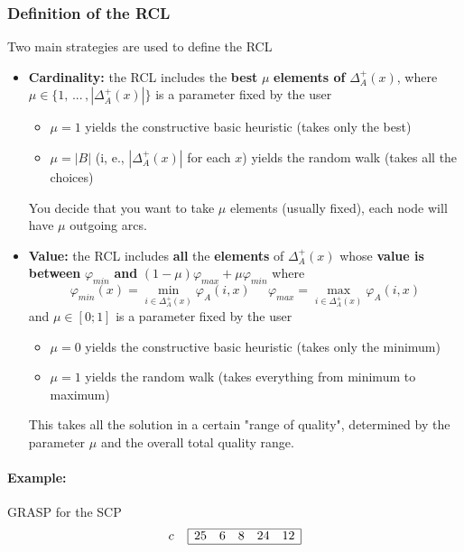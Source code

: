 \subsubsection{Definition of the RCL}
Two main strategies are used to define the RCL
\begin{itemize}
	\item \textbf{Cardinality:} the RCL includes the \textbf{best} $\mu$ \textbf{elements of} $\Delta_A^+ (x)$, where $\mu \in \{1,\, ... \, , |\Delta_A^+(x)|\}$ is a parameter fixed by the user
	\begin{itemize}
		\item $\mu = 1$ yields the constructive basic heuristic (takes only the best)
		\item $\mu = |B|$ (i, e., $|\Delta_A^+ (x)|$ for each $x$) yields the random walk (takes all the choices)
	\end{itemize}
	You decide that you want to take $\mu$ elements (usually fixed), each node will have $\mu$ outgoing arcs.\\
	
	\item \textbf{Value:} the RCL includes \textbf{all} the \textbf{elements} of $\Delta_A^+ (x)$ whose \textbf{value is between} $\varphi_{min}$ \textbf{and} $(1 − \mu) \varphi_{max} + \mu \varphi_{min}$ where
	$$ \varphi_{min} (x) = \min_{i \in \Delta_A^+ (x)} \varphi_A (i,x) \;\;\;\;\; \varphi_{max} = \max_{i \in \Delta_A^+ (x)} \varphi_A (i,x) $$
	and $\mu \in [0; 1]$ is a parameter fixed by the user
	\begin{itemize}
		\item $\mu = 0$ yields the constructive basic heuristic (takes only the minimum)
		\item $\mu = 1$ yields the random walk (takes everything from minimum to maximum)
	\end{itemize}
	This takes all the solution in a certain "range of quality", determined by the parameter $\mu$ and the overall total quality range.\\
\end{itemize}

\newpage

\paragraph{Example:} GRASP for the SCP 
$$
c \;\;\;\;
\begin{array}{| c c c c c |}
	\hline
	25 & 6 & 8 & 24 & 12 \\
	\hline
\end{array}
$$

